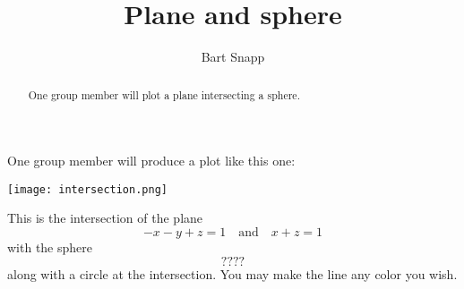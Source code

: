 \documentclass{ximera}
\author{Bart Snapp}
\title{Plane and sphere}
\begin{document}
\begin{abstract}
  One group member will plot a plane intersecting a sphere.
\end{abstract}
\maketitle

One group member will produce a plot like this one:
\begin{image}
  \texttt{[image: intersection.png]}
\end{image}

This is the intersection of the plane
\[
-x-y+z=1\quad\text{and}\quad  x+z=1
\]
with the sphere
\[
????
\]
along with a circle at the intersection. You may make the line any
color you wish.
\end{document}
